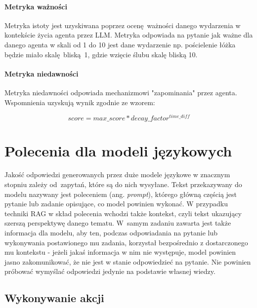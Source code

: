 \paragraph{Metryka ważności}
Metryka istoty jest uzyskiwana
poprzez ocenę ważności danego wydarzenia w kontekście życia agenta przez LLM.
Metryka odpowiada na pytanie jak ważne dla danego agenta w skali od 1 do 10 jest
dane wydarzenie np. pościelenie łóżka będzie miało skalę bliską 1, gdzie wzięcie
ślubu skalę bliską 10.

\paragraph{Metryka niedawności}
Metryka niedawności odpowiada mechanizmowi "zapominania" przez agenta.
Wspomnienia uzyskują wynik zgodnie ze wzorem:

\begin{equation}
	score = max\_score * decay\_factor ^ {time\_diff}
\end{equation}




\section{Polecenia dla modeli językowych}

Jakość odpowiedzi generowanych przez duże modele językowe w znacznym stopniu zależy od~zapytań, które są do nich wysyłane. Tekst przekazywany do modelu nazywany jest poleceniem (ang. \textit{prompt}), którego główną częścią jest pytanie lub zadanie opisujące, co model powinien wykonać. W przypadku techniki RAG w skład polecenia wchodzi także kontekst, czyli tekst ukazujący szerszą perspektywę danego tematu. W~samym zadaniu zawarta jest także informacja dla modelu, aby ten, podczas odpowiadania na pytanie lub wykonywania postawionego mu zadania, korzystał bezpośrednio z dostarczonego mu kontekstu - jeżeli jakaś informacja w nim nie występuje, model powinien jasno zakomunikować, że nie jest w stanie odpowiedzieć na pytanie. Nie powinien próbować wymyślać odpowiedzi jedynie na podstawie własnej wiedzy.

\subsection{Wykonywanie akcji}

